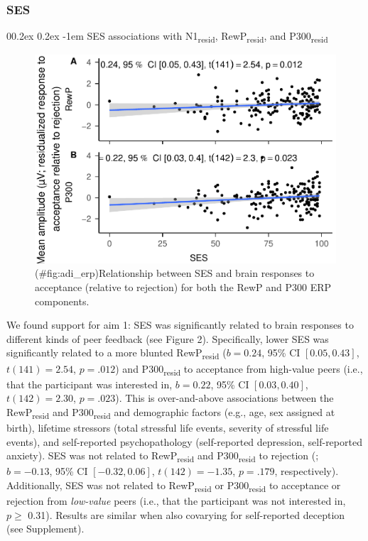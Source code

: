 \documentclass[
  man]{apa7}
\makeatletter
\let\oldparagraph\paragraph
\renewcommand{\paragraph}[1]{\oldparagraph{#1}\mbox{}}
\renewcommand{\paragraph}{\@startsection{paragraph}{4}{\parindent}%
  {0\baselineskip \@plus 0.2ex \@minus 0.2ex}%
  {-1em}%
  {\normalfont\normalsize\bfseries\itshape\typesectitle}}
\makeatother
\begin{document}
\hypertarget{ses}{%
\subsubsection{SES}\label{ses}}

\hypertarget{ses-associations-with-n1resid-rewpresid-and-p300resid}{%
\paragraph{\texorpdfstring{SES associations with N1\textsubscript{resid}, RewP\textsubscript{resid}, and P300\textsubscript{resid}}{SES associations with N1resid, RewPresid, and P300resid}}\label{ses-associations-with-n1resid-rewpresid-and-p300resid}}

\begin{figure}
\centering
\includegraphics{BUDS_manuscript_working_files/figure-latex/adi_erp-1.pdf}
\caption{(\#fig:adi\_erp)Relationship between SES and brain responses to acceptance (relative to rejection) for both the RewP and P300 ERP components.}
\end{figure}

We found support for aim 1: SES was significantly related to brain responses to different kinds of peer feedback (see Figure 2). Specifically, lower SES was significantly related to a more blunted RewP\textsubscript{resid} (\(b = 0.24\), 95\% CI \([0.05, 0.43]\), \(t(141) = 2.54\), \(p = .012\)) and P300\textsubscript{resid} to acceptance from high-value peers (i.e., that the participant was interested in, \(b = 0.22\), 95\% CI \([0.03, 0.40]\), \(t(142) = 2.30\), \(p = .023\)). This is over-and-above associations between the RewP\textsubscript{resid} and P300\textsubscript{resid} and demographic factors (e.g., age, sex assigned at birth), lifetime stressors (total stressful life events, severity of stressful life events), and self-reported psychopathology (self-reported depression, self-reported anxiety). SES was not related to RewP\textsubscript{resid} and P300\textsubscript{resid} to rejection (; \(b = -0.13\), 95\% CI \([-0.32, 0.06]\), \(t(142) = -1.35\), \(p = .179\), respectively). Additionally, SES was not related to RewP\textsubscript{resid} or P300\textsubscript{resid} to acceptance or rejection from \emph{low-value} peers (i.e., that the participant was not interested in, \(p \ge\) 0.31). Results are similar when also covarying for self-reported deception (see Supplement).
\end{document}
